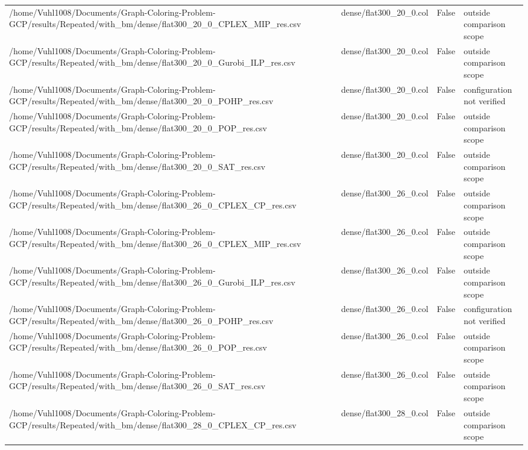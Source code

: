 \begin{table}[htbp]
\begin{tabular}{llll}
/home/Vuhl1008/Documents/Graph-Coloring-Problem-GCP/results/Repeated/with\_bm/dense/flat300\_20\_0\_CPLEX\_MIP\_res.csv & dense/flat300\_20\_0.col & False & outside comparison scope \\
/home/Vuhl1008/Documents/Graph-Coloring-Problem-GCP/results/Repeated/with\_bm/dense/flat300\_20\_0\_Gurobi\_ILP\_res.csv & dense/flat300\_20\_0.col & False & outside comparison scope \\
/home/Vuhl1008/Documents/Graph-Coloring-Problem-GCP/results/Repeated/with\_bm/dense/flat300\_20\_0\_POHP\_res.csv & dense/flat300\_20\_0.col & False & configuration not verified \\
/home/Vuhl1008/Documents/Graph-Coloring-Problem-GCP/results/Repeated/with\_bm/dense/flat300\_20\_0\_POP\_res.csv & dense/flat300\_20\_0.col & False & outside comparison scope \\
/home/Vuhl1008/Documents/Graph-Coloring-Problem-GCP/results/Repeated/with\_bm/dense/flat300\_20\_0\_SAT\_res.csv & dense/flat300\_20\_0.col & False & outside comparison scope \\
/home/Vuhl1008/Documents/Graph-Coloring-Problem-GCP/results/Repeated/with\_bm/dense/flat300\_26\_0\_CPLEX\_CP\_res.csv & dense/flat300\_26\_0.col & False & outside comparison scope \\
/home/Vuhl1008/Documents/Graph-Coloring-Problem-GCP/results/Repeated/with\_bm/dense/flat300\_26\_0\_CPLEX\_MIP\_res.csv & dense/flat300\_26\_0.col & False & outside comparison scope \\
/home/Vuhl1008/Documents/Graph-Coloring-Problem-GCP/results/Repeated/with\_bm/dense/flat300\_26\_0\_Gurobi\_ILP\_res.csv & dense/flat300\_26\_0.col & False & outside comparison scope \\
/home/Vuhl1008/Documents/Graph-Coloring-Problem-GCP/results/Repeated/with\_bm/dense/flat300\_26\_0\_POHP\_res.csv & dense/flat300\_26\_0.col & False & configuration not verified \\
/home/Vuhl1008/Documents/Graph-Coloring-Problem-GCP/results/Repeated/with\_bm/dense/flat300\_26\_0\_POP\_res.csv & dense/flat300\_26\_0.col & False & outside comparison scope \\
/home/Vuhl1008/Documents/Graph-Coloring-Problem-GCP/results/Repeated/with\_bm/dense/flat300\_26\_0\_SAT\_res.csv & dense/flat300\_26\_0.col & False & outside comparison scope \\
/home/Vuhl1008/Documents/Graph-Coloring-Problem-GCP/results/Repeated/with\_bm/dense/flat300\_28\_0\_CPLEX\_CP\_res.csv & dense/flat300\_28\_0.col & False & outside comparison scope \\

\end{tabular}
\end{table}
